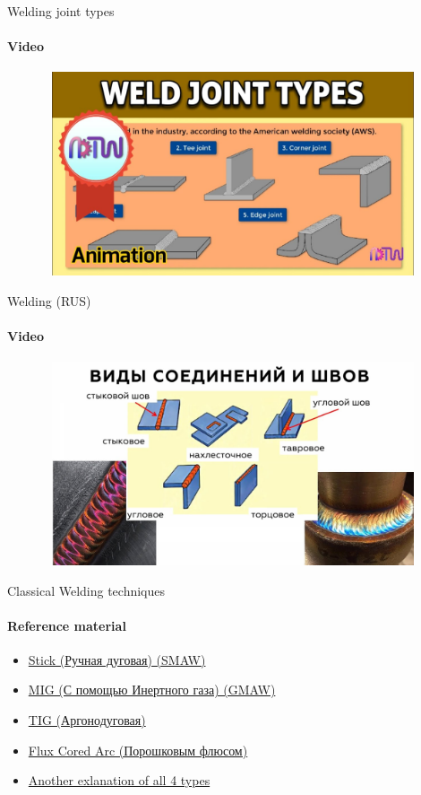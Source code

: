 \documentclass[aspectratio=169]{beamer}
\begin{document}
\begin{frame}[t]{Welding joint types}
    \framesubtitle{Video}
    \vspace{-0.6cm}
    \begin{figure}[H]
        \href{https://youtu.be/8kbUZLuhrW8}{
            \centering\includegraphics[height=6cm,width=1\textwidth,keepaspectratio]{weld_joint_types_video.jpg}}
        \label{fig:weld_joint_types_video.jpg}
    \end{figure}
\end{frame}

\begin{frame}[t]{Welding (RUS)}
    \framesubtitle{Video}
    \vspace{-0.6cm}
    \begin{figure}[H]
        \href{https://youtu.be/bCe_WB7vO-A}{
            \centering\includegraphics[height=6cm,width=1\textwidth,keepaspectratio]{welding_rus_video.jpg}}
        \label{fig:welding_rus_video.jpg}
    \end{figure}
\end{frame}

\begin{frame}[t]{Classical Welding techniques}
    \framesubtitle{Reference material}
    \begin{itemize}
        \item \href{https://www.youtube.com/watch?v=elmDvqdeMKI}{Stick (Ручная дуговая) (SMAW)}
        \item \href{https://youtu.be/twUAa5LWUvk}{MIG (С помощью Инертного газа) (GMAW)}
        \item \href{https://youtu.be/uO5pVLOAmD4}{TIG (Аргонодуговая)}
        \item \href{https://www.youtube.com/watch?v=TPSQJXqSwTg}{Flux Cored Arc (Порошковым флюсом)}
        \item \href{https://youtu.be/y-OKi8oSNQ4}{Another exlanation of all 4 types}
    \end{itemize}
\end{frame}
\end{document}

